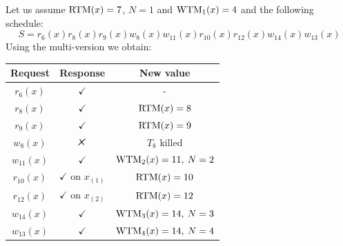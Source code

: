 \documentclass[12pt, a4paper]{report}
\begin{document}
    \begin{example}
        Let us assume $\textnormal{RTM}(x)=7$, $N=1$ and $\textnormal{WTM}_1(x)=4$ and the following schedule: 
        \[S=r_6(x) r_8(x) r_9(x) w_8(x) w_{11}(x) r_{10}(x) r_{12}(x) w_{14}(x) w_{13}(x)\]
        Using the multi-version we obtain: 
        \begin{table}[H]
            \centering
            \begin{tabular}{ccc}
            \textbf{Request} & \textbf{Response}         & \textbf{New value}  \\ \hline
            $r_6(x)$         & $\checkmark$              & -                   \\
            $r_8(x)$         & $\checkmark$              & $\textnormal{RTM}(x)=8$          \\
            $r_9(x)$         & $\checkmark$              & $\textnormal{RTM}(x)=9$          \\
            $w_8(x)$         & $\tikzxmark$              & $T_8$ killed        \\
            $w_{11}(x)$      & $\checkmark$              & $\textnormal{WTM}_2(x)=11,\:N=2$ \\
            $r_{10}(x)$      & $\checkmark$ on $x_{(1)}$ & $\textnormal{RTM}(x)=10$         \\
            $r_{12}(x)$      & $\checkmark$ on $x_{(2)}$ & $\textnormal{RTM}(x)=12$         \\
            $w_{14}(x)$      & $\checkmark$              & $\textnormal{WTM}_3(x)=14,\:N=3$ \\
            $w_{13}(x)$      & $\checkmark$              & $\textnormal{WTM}_4(x)=14,\:N=4$
            \end{tabular}
        \end{table}
    \end{example}
\end{document}
